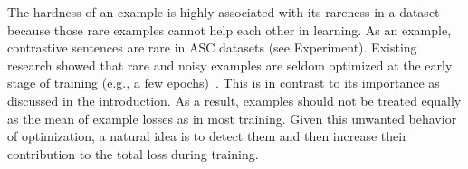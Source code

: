 The hardness of an example is highly associated with its rareness in a dataset because those rare examples cannot help each other in learning.
As an example, contrastive sentences are rare in ASC datasets (see Experiment).
Existing research showed that rare and noisy examples are seldom optimized at the early stage of training (e.g., a few epochs)~\cite{gao2016sample}. 
This is in contrast to its importance as discussed in the introduction.
As a result, examples should not be treated equally as the mean of example losses as in most training.
Given this unwanted behavior of optimization, a natural idea is to detect them and then increase their contribution to the total loss during training.

